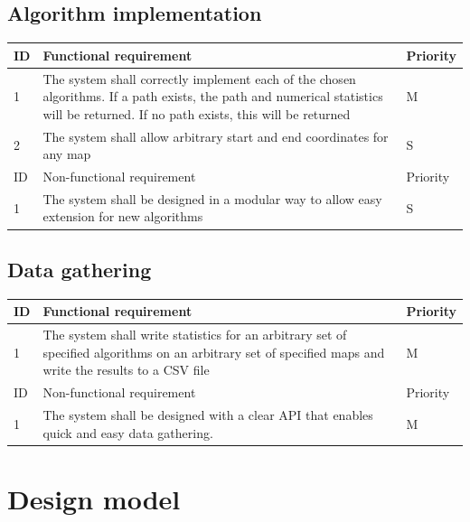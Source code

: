 \documentclass[12pt,notitlepage]{report}
\begin{document}
\subsection{Algorithm implementation}

\begin{center}
    \begin{tabular}{ l | p{10cm} | l}
    ID & Functional requirement & Priority  \\ \hline
    1 & The system shall correctly implement each of the chosen algorithms. If a path exists, the path and numerical statistics will be returned. If no path exists, this will be returned   & M \\ \hline
    2 & The system shall allow arbitrary start and end coordinates for any map & S \\ \hline
     \hline 
    ID & Non-functional requirement & Priority  \\ \hline
    1 & The system shall be designed in a modular way to allow easy extension for new algorithms & S \\
    \end{tabular}
\end{center}

\subsection{Data gathering}

\begin{center}
    \begin{tabular}{ l | p{10cm} | l}
    ID & Functional requirement & Priority  \\ \hline
    1 & The system shall write statistics for an arbitrary set of specified algorithms on an arbitrary set of specified maps and write the results to a CSV file & M \\ \hline
     \hline 
    ID & Non-functional requirement & Priority  \\ \hline
    1 & The system shall be designed with a clear API that enables quick and easy data gathering. & M \\
    \end{tabular}
\end{center}

\noindent
{}

\section {Design model}
\end{document}
